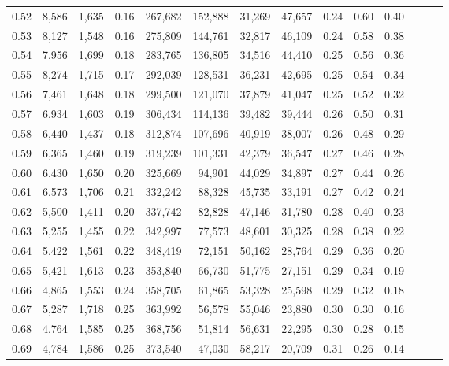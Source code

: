 \begin{tabular}{rrrrrrrrrrrrrr}
0.52 &   8,586 &  1,635 &  0.16 &  267,682 &  152,888 &  31,269 &  47,657 &  0.24 &  0.60 &      0.40 \\
0.53 &   8,127 &  1,548 &  0.16 &  275,809 &  144,761 &  32,817 &  46,109 &  0.24 &  0.58 &      0.38 \\
0.54 &   7,956 &  1,699 &  0.18 &  283,765 &  136,805 &  34,516 &  44,410 &  0.25 &  0.56 &      0.36 \\
0.55 &   8,274 &  1,715 &  0.17 &  292,039 &  128,531 &  36,231 &  42,695 &  0.25 &  0.54 &      0.34 \\
0.56 &   7,461 &  1,648 &  0.18 &  299,500 &  121,070 &  37,879 &  41,047 &  0.25 &  0.52 &      0.32 \\
0.57 &   6,934 &  1,603 &  0.19 &  306,434 &  114,136 &  39,482 &  39,444 &  0.26 &  0.50 &      0.31 \\
0.58 &   6,440 &  1,437 &  0.18 &  312,874 &  107,696 &  40,919 &  38,007 &  0.26 &  0.48 &      0.29 \\
0.59 &   6,365 &  1,460 &  0.19 &  319,239 &  101,331 &  42,379 &  36,547 &  0.27 &  0.46 &      0.28 \\
0.60 &   6,430 &  1,650 &  0.20 &  325,669 &   94,901 &  44,029 &  34,897 &  0.27 &  0.44 &      0.26 \\
0.61 &   6,573 &  1,706 &  0.21 &  332,242 &   88,328 &  45,735 &  33,191 &  0.27 &  0.42 &      0.24 \\
0.62 &   5,500 &  1,411 &  0.20 &  337,742 &   82,828 &  47,146 &  31,780 &  0.28 &  0.40 &      0.23 \\
0.63 &   5,255 &  1,455 &  0.22 &  342,997 &   77,573 &  48,601 &  30,325 &  0.28 &  0.38 &      0.22 \\
0.64 &   5,422 &  1,561 &  0.22 &  348,419 &   72,151 &  50,162 &  28,764 &  0.29 &  0.36 &      0.20 \\
0.65 &   5,421 &  1,613 &  0.23 &  353,840 &   66,730 &  51,775 &  27,151 &  0.29 &  0.34 &      0.19 \\
0.66 &   4,865 &  1,553 &  0.24 &  358,705 &   61,865 &  53,328 &  25,598 &  0.29 &  0.32 &      0.18 \\
0.67 &   5,287 &  1,718 &  0.25 &  363,992 &   56,578 &  55,046 &  23,880 &  0.30 &  0.30 &      0.16 \\
0.68 &   4,764 &  1,585 &  0.25 &  368,756 &   51,814 &  56,631 &  22,295 &  0.30 &  0.28 &      0.15 \\
0.69 &   4,784 &  1,586 &  0.25 &  373,540 &   47,030 &  58,217 &  20,709 &  0.31 &  0.26 &      0.14 \\

\end{tabular}
